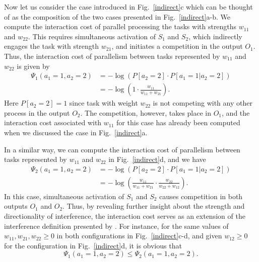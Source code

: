 \documentclass[10pt,letterpaper]{article}
\begin{document}
Now let us consider the case introduced in Fig.~\ref{indirect}c which can be thought of as the composition of the two cases presented in Fig.~\ref{indirect}a-b. We compute the interaction cost of parallel processing the tasks with strengths $w_{11}$ and $w_{22}$. This requires simultaneous activation of $S_1$ and $S_2$, which indirectly engages the task with strength $w_{21}$, and initiates a competition in the output $O_1$. Thus, the interaction cost of parallelism between tasks represented by $w_{11}$ and $w_{22}$ is given by
\begin{align*}
\Psi_1(a_1=1,a_2=2)
&= -\log(P[a_2=2] \cdot P[a_1=1|a_2=2])
\\
&= -\log\left(1 \cdot \frac{w_{11}}{w_{11}+w_{21}}\right).
\end{align*}
Here $P[a_2=2]=1$ since task with weight $w_{22}$ is not competing with any other process in the output $O_2$. The competition, however, takes place in $O_1$, and the interaction cost associated with $w_{11}$ for this case has already been computed when we discussed the case in Fig.~\ref{indirect}a. 

In a similar way, we can compute the interaction cost of parallelism between tasks represented by $w_{11}$ and $w_{22}$ in Fig.~\ref{indirect}d, and we have
\begin{align*}
\Psi_2(a_1=1,a_2=2)
&= -\log(P[a_2=2] \cdot P[a_1=1|a_2=2])
\\
&= -\log\left(\frac{w_{11}}{w_{11}+w_{21}} \cdot \frac{w_{22}}{w_{22}+w_{12}}\right).
\end{align*}
In this case, simultaneous activation of $S_1$ and $S_2$ causes competition in both outputs $O_1$ and $O_2$. Thus, by revealing further insight about the strength and directionality of interference, the interaction cost serves as an extension of the interference definition presented by \cite{CogSci_2016}. For instance, for the same values of $w_{11}, w_{21}, w_{22} \geq 0$ in both configurations in Fig.~\ref{indirect}c-d, and given $w_{12} \geq 0$ for the configuration in Fig.~\ref{indirect}d, it is obvious that 
\begin{displaymath}
\Psi_1(a_1=1,a_2=2) \leq \Psi_2(a_1=1,a_2=2).
\end{displaymath}
%
%

%
%
%
\end{document}
